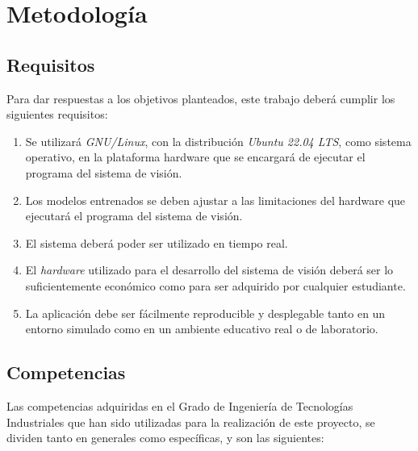 \chapter{Metodología}
\label{cap:capitulo7}

\section{Requisitos}
\label{sec:requisitos}

Para dar respuestas a los objetivos planteados, este trabajo deberá cumplir los siguientes requisitos:

\begin{enumerate}
  \item Se utilizará \textit{GNU/Linux}, con la distribución \textit{Ubuntu 22.04 LTS}, como sistema operativo, en la plataforma hardware que se encargará de ejecutar el programa del sistema de visión.
  \item Los modelos entrenados se deben ajustar a las limitaciones del hardware que ejecutará el programa del sistema de visión.
  \item El sistema deberá poder ser utilizado en tiempo real. 
  \item El \textit{hardware} utilizado para el desarrollo del sistema de visión deberá ser lo suficientemente económico como para ser adquirido por cualquier estudiante.
  \item La aplicación debe ser fácilmente reproducible y desplegable tanto en un entorno simulado como en un ambiente educativo real o de laboratorio.
\end{enumerate} 

\section{Competencias}
\label{sec:competencias}

Las competencias adquiridas en el Grado de Ingeniería de Tecnologías Industriales que han sido utilizadas para la realización de este proyecto, se dividen tanto en generales como específicas, y son las siguientes:

